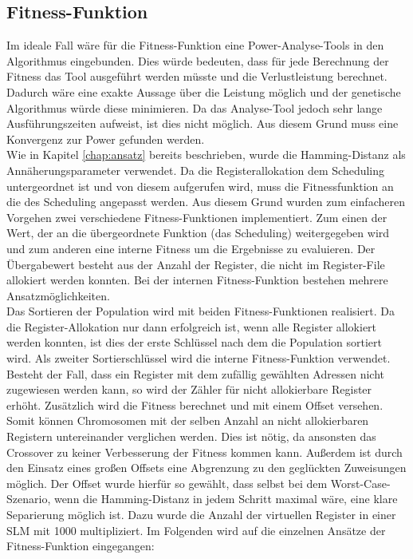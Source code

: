 \subsection{Fitness-Funktion}
\label{chap:Fitness-Funktion}
Im ideale Fall wäre für die Fitness-Funktion eine Power-Analyse-Tools in den Algorithmus eingebunden. Dies würde bedeuten, dass für jede Berechnung der Fitness das Tool ausgeführt werden müsste und die Verlustleistung berechnet. Dadurch wäre eine exakte Aussage über die Leistung möglich und der genetische Algorithmus würde diese minimieren. Da das Analyse-Tool jedoch sehr lange Ausführungszeiten aufweist, ist dies nicht möglich. Aus diesem Grund muss eine Konvergenz zur Power gefunden werden.\\
Wie in Kapitel \ref{chap:ansatz} bereits beschrieben, wurde die Hamming-Distanz als Annäherungsparameter verwendet. Da die Registerallokation dem Scheduling untergeordnet ist und von diesem aufgerufen wird, muss die Fitnessfunktion an die des Scheduling angepasst werden. Aus diesem Grund wurden zum einfacheren Vorgehen zwei verschiedene Fitness-Funktionen implementiert. Zum einen der Wert, der an die übergeordnete Funktion (das Scheduling) weitergegeben wird und zum anderen eine interne Fitness um die Ergebnisse zu evaluieren.
Der Übergabewert besteht aus der Anzahl der Register, die nicht im Register-File allokiert werden konnten. Bei der internen Fitness-Funktion bestehen mehrere Ansatzmöglichkeiten.\\
Das Sortieren der Population wird mit beiden Fitness-Funktionen realisiert. Da die Register-Allokation nur dann erfolgreich ist, wenn alle Register allokiert werden konnten, ist dies der erste Schlüssel nach dem die Population sortiert wird. Als zweiter Sortierschlüssel wird die interne Fitness-Funktion verwendet.
Besteht der Fall, dass ein Register mit dem zufällig gewählten Adressen nicht zugewiesen werden kann, so wird der Zähler für nicht allokierbare Register erhöht. Zusätzlich wird die Fitness berechnet und mit einem Offset versehen. Somit können Chromosomen mit der selben Anzahl an nicht allokierbaren Registern untereinander verglichen werden. Dies ist nötig, da ansonsten das Crossover zu keiner Verbesserung der Fitness kommen kann. Außerdem ist durch den Einsatz eines großen Offsets eine Abgrenzung zu den geglückten Zuweisungen möglich. Der Offset wurde hierfür  so gewählt, dass selbst bei dem Worst-Case-Szenario, wenn die Hamming-Distanz in jedem Schritt maximal wäre, eine klare Separierung möglich ist. Dazu wurde die Anzahl der virtuellen Register in einer SLM mit 1000 multipliziert.
Im Folgenden wird auf die einzelnen Ansätze der Fitness-Funktion eingegangen:

